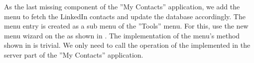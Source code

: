 \documentclass[a4paper,10pt,twoside]{book}
\begin{document}
As the last missing component of the ''My Contacts'' application, we add the menu to fetch the LinkedIn contacts and update the database accordingly. 
The menu entry is created as a sub menu of the ''Tools'' menu.
For this, use the new menu wizard on the  as shown in . 
The implementation of the menu's  method shown in  is trivial. 
We only need to call the operation of the  implemented in the server part of the ''My Contacts'' application. 

\ifx\wholebook\relax\else
   
   
\end{document}
